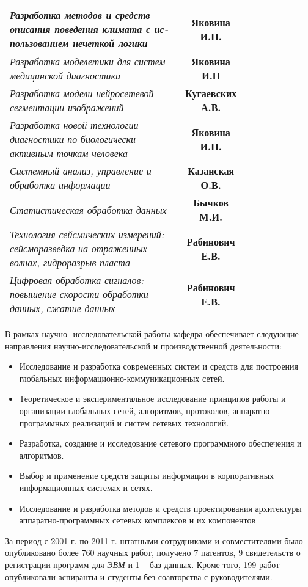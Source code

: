 \documentclass[12pt,a4paper]{article}
\begin{document}
\begin{flushleft}
\begin{flushleft}
\begin{tabular}{||p{0.8\linewidth} || c||c||}
\textit{Разработка методов и средств описания поведения климата с ис-
пользованием нечеткой логики} & \textbf{Яковина И.Н.} \\
\hline
\textit{Разработка моделетики для систем медицинской диагностики} & \textbf{Яковина И.Н} \\
\hline
\textit{Разработка модели нейросетевой сегментации изображений} & \textbf{Кугаевских А.В.} \\
\hline
\textit{Разработка новой технологии диагностики по биологически активным точкам человека} & \textbf{Яковина И.Н.} \\
\hline
\textit{Системный анализ, управление и обработка информации} & \textbf{Казанская О.В.} \\
\hline
\textit{Статистическая обработка данных} & \textbf{Бычков М.И.} \\
\hline
\textit{Технология сейсмических измерений: сейсморазведка на отраженных волнах, гидроразрыв пласта} & \textbf{Рабинович Е.В.} \\
\hline
\textit{Цифровая обработка сигналов: повышение скорости обработки данных, сжатие данных} & \textbf{Рабинович Е.В.} \\
\hline
\end{tabular}
В рамках научно-
исследовательской работы кафедра обеспечивает следующие направления научно-исследовательской и производственной деятельности:
\begin{itemize}
\item Исследование и разработка современных систем и средств для построения глобальных информационно-коммуникационных сетей.
\item Теоретическое и экспериментальное исследование принципов работы и организации глобальных сетей, алгоритмов, протоколов, аппаратно-программных реализаций и систем сетевых технологий.
\item Разработка, создание и исследование сетевого программного обеспечения и алгоритмов.
\item Выбор и применение средств защиты информации в корпоративных информационных системах и сетях.
\item Исследование и разработка методов и средств проектирования архитектуры аппаратно-программных сетевых комплексов и их компонентов
\end{itemize}
За период с 2001 г. по 2011 г. штатными сотрудниками и совместителями было опубликовано более 760 научных работ, получено 7 патентов, 9 свидетельств о регистрации программ для \textit{ЭВМ} и 1 – баз данных. Кроме того, 199 работ опубликовали аспиранты и студенты без соавторства с руководителями.

\end{flushleft}
\end{flushleft}
\end{document}
